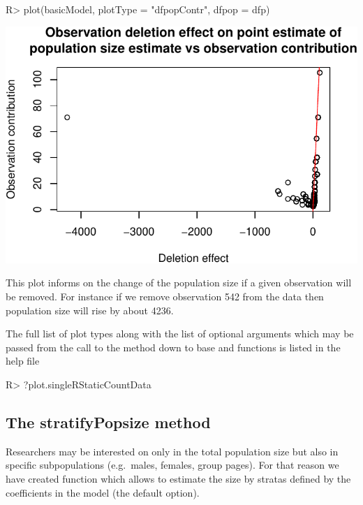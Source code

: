 \documentclass[
]{jss}
\newcommand{\1}{\mathcal{I}} \newcommand{\bZero}{\boldsymbol{0}}
\begin{document}
\begin{CodeChunk}
\begin{CodeInput}
R> plot(basicModel, plotType = "dfpopContr", dfpop = dfp)
\end{CodeInput}


\begin{center}\includegraphics{singleRcapture_files/figure-latex/dfpopsize_plot-1} \end{center}

\end{CodeChunk}

This plot informs on the change of the population size if a given
observation will be removed. For instance if we remove observation 542
from the data then population size will rise by about 4236.

The full list of plot types along with the list of optional arguments
which may be passed from the call to the  method down to base
 and  functions is listed in the help file

\begin{CodeChunk}
\begin{CodeInput}
R> ?plot.singleRStaticCountData
\end{CodeInput}
\end{CodeChunk}

\subsection{The stratifyPopsize
method}\label{the-stratifypopsize-method}

Researchers may be interested on only in the total population size but
also in specific subpopulations (e.g.~males, females, group pages). For
that reason we have created function  which allows
to estimate the size by stratas defined by the coefficients in the model
(the default option).
\end{document}

